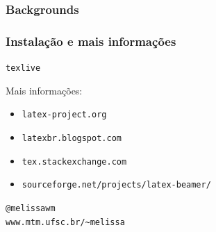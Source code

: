 \documentclass{beamer}
\begin{document}
{%
   \begin{frame}%
      \frametitle{Backgrounds}%
      \makebox[\textwidth][c]{
         \begin{tikzpicture}
            \node[fill=white, fill opacity=0.5, text opacity=1] {};
         \end{tikzpicture}
      }
   \end{frame}%
}

\begin{frame}[fragile]
   \frametitle{Instalação e mais informações}
   \begin{center}
      \verb+texlive+
   \end{center}
   Mais informações:
   \begin{itemize}
      \item \verb+latex-project.org+
      \item \verb+latexbr.blogspot.com+
      \item \verb+tex.stackexchange.com+
      \item \verb+sourceforge.net/projects/latex-beamer/+
   \end{itemize}

   \begin{center}
      \verb+@melissawm+\\
      \verb+www.mtm.ufsc.br/~melissa+
   \end{center}
\end{frame}
\end{document}
